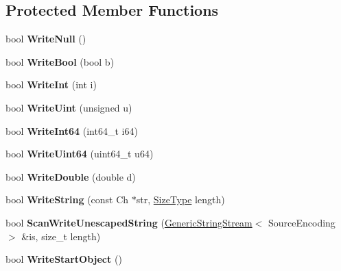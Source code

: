 \subsection*{Protected Member Functions}
\begin{DoxyCompactItemize}
\item 
\mbox{\label{a02224_a44862b3eba8d84b909c69aba875c9f4d}} 
bool {\bfseries Write\+Null} ()
\item 
\mbox{\label{a02224_a42ad68b6950431bb8ca0199568546eaf}} 
bool {\bfseries Write\+Bool} (bool b)
\item 
\mbox{\label{a02224_a31d0feda654ca245c41462be7dc59998}} 
bool {\bfseries Write\+Int} (int i)
\item 
\mbox{\label{a02224_a2861227e93707d1478d2cf56644dca3b}} 
bool {\bfseries Write\+Uint} (unsigned u)
\item 
\mbox{\label{a02224_aa58d3f80c06394648de5055ecfb41587}} 
bool {\bfseries Write\+Int64} (int64\+\_\+t i64)
\item 
\mbox{\label{a02224_ad07b325157220e3aa791c1c8c904021e}} 
bool {\bfseries Write\+Uint64} (uint64\+\_\+t u64)
\item 
\mbox{\label{a02224_ae7a0fc4740681d845d92c1213bd25aa1}} 
bool {\bfseries Write\+Double} (double d)
\item 
\mbox{\label{a02224_acda4412ef5f4cac6e89f9544e4b10f70}} 
bool {\bfseries Write\+String} (const Ch $\ast$str, \hyperlink{a00560_a5ed6e6e67250fadbd041127e6386dcb5}{Size\+Type} length)
\item 
\mbox{\label{a02224_a94140803bba7863a1b39c936bbe6d262}} 
bool {\bfseries Scan\+Write\+Unescaped\+String} (\hyperlink{a02200}{Generic\+String\+Stream}$<$ Source\+Encoding $>$ \&is, size\+\_\+t length)
\item 
\mbox{\label{a02224_a81c72a2eecd47e042f56ca93a27a5cb1}} 
bool {\bfseries Write\+Start\+Object} ()
\item 
\mbox{\label{a02224_a7e3f6760a50a72f4217a9b2d625c43ee}} 

\end{DoxyCompactItemize}
